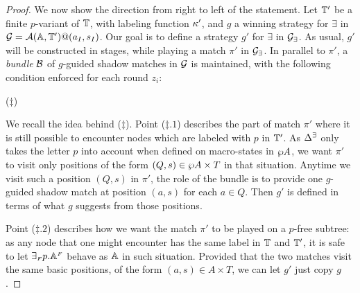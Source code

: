 \begin{proof}
We now show the direction from right to left of the statement. Let $\mathbb{T}'$ be a finite $p$-variant of
$\mathbb{T}$, with labeling function $\kappa'$, and $g$ a winning strategy for $\exists$ in $\mathcal{G} = \mathcal{A}(\mathbb{A},\mathbb{T}')@(a_I,s_I)$. Our goal is to define a strategy $g'$ for $\exists$ in $\mathcal{G_{\exists}}$. As usual, $g'$ will be constructed in stages, while playing a match $\pi'$ in $\mathcal{G_{\exists}}$. In parallel to $\pi'$, a \emph{bundle} $\mathcal{B}$ of $g$-guided shadow matches in $\mathcal{G}$ is maintained, with the following condition enforced for each round $z_i$:
\smallskip
\begin{center}
\hspace*{0.3cm}($\ddag$)
\end{center}
\smallskip
We recall the idea behind ($\ddag$). Point ($\ddag.1$) describes the part of match $\pi'$ where it is still possible to encounter nodes which are labeled with $p$ in $\mathbb{T}'$. As $\Delta^\exists$ only takes the letter $p$ into account when defined on macro-states in $\wp A$, we want $\pi'$ to visit only positions of the form $(Q,s) \in \wp A \times T$ in that situation. Anytime we visit such a position $(Q,s)$ in $\pi'$, the role of the bundle is to provide one $g$-guided shadow match at position $(a,s)$ for each $a \in Q$.
Then $g'$ is defined in terms of what $g$ suggests from those positions.

 Point ($\ddag.2$) describes how we want the match $\pi'$ to be
 played on a $p$-free subtree: as any node that one might encounter has the same label in $\mathbb{T}$ and $\mathbb{T}'$,
it is safe to let ${\exists_{{\scriptscriptstyle F}} p}.\mathbb{A}^{{\scriptscriptstyle F}}$ behave as $\mathbb{A}$ in such situation. Provided that the two matches visit the same basic positions, of the form $(a,s)\in A \times T$, we can let $g'$ just copy $g$.


\end{proof}
